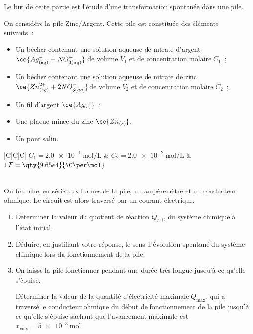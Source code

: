 Le but de cette partie est l'étude d'une transformation spontanée dans une
pile.

On considère la pile Zinc/Argent. Cette pile est constituée des éléments
suivants~:
\begin{itemize}
    \item Un bécher contenant une solution aqueuse de nitrate d'argent
          $\ce{Ag^{+}_{(aq)} + NO^{-}_{3(aq)}}$ de volume $V_{1}$ et de
          concentration molaire $C_{1}$~;
    \item Un bécher contenant une solution aqueuse de nitrate de zinc
          $\ce{Zn^{2+}_{(aq)} + 2NO^{-}_{3(aq)}}$de volume $V_{2}$ et de
          concentration molaire $C_{2}$~;
    \item Un fil d'argent $\ce{Ag_{(s)}}$~;
    \item Une plaque mince du zinc $\ce{Zn_{(s)}}$.
    \item Un pont salin.
\end{itemize}

\begin{donnees}
    \begin{table}[H]
    \centering
    \begin{tabularx}{\textwidth}{|C|C|C|}
        \hline
        $C_{1}=\qty{2.0e-1}{\mol\per\L}$ & $C_{2}=\qty{2.0e-2}{\mol\per\L}$ &
        $1 \mathcal{F}=\qty{9.65e4}{\C\per\mol}$ \\
        \hline
         \\
        \hline
        \end{tabularx}
    \end{table}
\end{donnees}

On branche, en série aux bornes de la pile, un ampèremètre et un conducteur
ohmique. Le circuit est alors traversé par un courant électrique.
\begin{enumerate}
    \item Déterminer la valeur du quotient de réaction $Q_{r,i}$, du système
          chimique à l'état initial .
    \item Déduire, en justifiant votre réponse, le sens d'évolution spontané du
          système chimique lors du fonctionnement de la pile.
    \item On laisse la pile fonctionner pendant une durée très longue jusqu'à ce
          qu'elle s'épuise.

          Déterminer la valeur de la quantité d'électricité maximale $Q_{\max}$,
          qui a traversé le conducteur ohmique du début de fonctionnement de la
          pile jusqu'à ce qu'elle s'épuise sachant que l'avancement maximale est
          $x_{\max}=\qty{5e-3}{\mol}$.
\end{enumerate}

